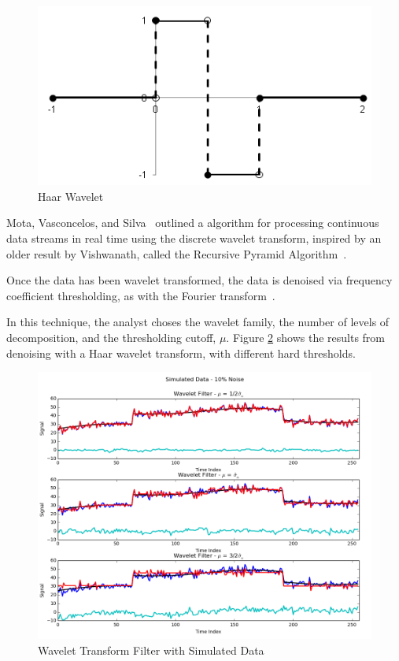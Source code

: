 \documentclass[11pt]{article}
\theoremstyle{definition}
\begin{document}
\begin{figure}[h!]
\centering
\includegraphics[width = 0.6 \textwidth]{HaarWavelet.png}
\caption{Haar Wavelet}
\label{haarwavelet}
\end{figure}

Mota, Vasconcelos, and Silva~\cite{Mota05} outlined a algorithm for
processing continuous data streams in real time using the discrete
wavelet transform, inspired by an older result by Vishwanath, called
the Recursive Pyramid Algorithm~\cite{Vishwanath94}.

Once the data has been wavelet transformed, the data is denoised via
frequency coefficient thresholding, as with the Fourier
transform~\cite{fodor03:denoising}.

In this technique, the analyst choses the wavelet family, the number
of levels of decomposition, and the thresholding cutoff, $\mu$. Figure
\ref{waveletcompare} shows the results from denoising with a Haar
wavelet transform, with different hard thresholds.

\begin{figure}[h!]
\centering
\includegraphics[width = 0.9 \textwidth]{WaveletCompare.png}
\caption{Wavelet Transform Filter with Simulated Data}
\label{waveletcompare}
\end{figure}
\end{document}
